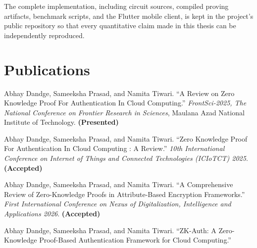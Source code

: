 \documentclass[12pt,a4paper,oneside]{report}
\begin{document}
The complete implementation, including circuit sources, compiled proving
artifacts, benchmark scripts, and the Flutter mobile client, is kept in
the project's public repository so that every quantitative claim made in
this thesis can be independently reproduced.

\clearpage
\chapter*{Publications}

\begin{enumerate}[label={[\arabic*]}, itemsep=1.5ex, leftmargin=*]
  \item Abhay Dandge, Sameeksha Prasad, and Namita Tiwari. ``A Review on Zero Knowledge Proof For Authentication In Cloud Computing.'' \textit{FrontSci-2025, The National Conference on Frontier Research in Sciences}, Maulana Azad National Institute of Technology. \textbf{(Presented)}

  \item Abhay Dandge, Sameeksha Prasad, and Namita Tiwari. ``Zero Knowledge Proof For Authentication In Cloud Computing : A Review.'' \textit{10th International Conference on Internet of Things and Connected Technologies (ICIoTCT) 2025}. \textbf{(Accepted)}

  \item Abhay Dandge, Sameeksha Prasad, and Namita Tiwari. ``A Comprehensive Review of Zero-Knowledge Proofs in Attribute-Based Encryption Frameworks.'' \textit{First International Conference on Nexus of Digitalization, Intelligence and Applications 2026}. \textbf{(Accepted)}

  \item Abhay Dandge, Sameeksha Prasad, and Namita Tiwari. ``ZK-Auth: A Zero-Knowledge Proof-Based Authentication Framework for Cloud Computing.''
\end{enumerate}
\end{document}
